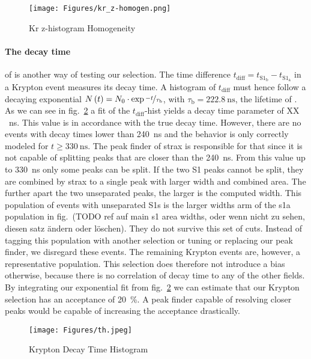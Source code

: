 \begin{figure}
\centering
\texttt{[image: Figures/kr\_z-homogen.png]}  %
\caption[Kr z-histogram Homogeneity]{
    Kr z-histogram Homogeneity
    }
\label{fig:z-hist-homogen}
\end{figure}



\paragraph{The decay time} of  is another way of testing our selection.
The time difference $ t_\mathrm{diff} = t_{\mathrm{S}1_\mathrm{b}} - t_{\mathrm{S}1_\mathrm{a}} $ in a Krypton event measures its decay time.
A histogram of $ t_\mathrm{diff} $ must hence follow a decaying exponential $ N \left( t \right) = N_0 \cdot \exp{\nicefrac{-t}{\tau_\mathrm{b}}} $, with $ \tau_\mathrm{b} = \SI{222.8}{\nano\s} $, the lifetime of .
As we can see in fig.~\ref{fig:kr-decaytime} a fit of the $ t_\mathrm{diff} $-hist yields a decay time parameter of XX \SI{}{\nano\s}. %
This value is in accordance with the true decay time. %
However, there are no events with decay times lower than \SI{240}{\nano\s} and the behavior is only correctly modeled for $ t \ge \SI{330}{\nano\s} $.
The peak finder of strax is responsible for that since it is not capable of splitting peaks that are closer than the \SI{240}{\nano\s}.
From this value up to \SI{330}{\nano\s} only some peaks can be split.
If the two S1 peaks cannot be split, they are combined by strax to a single peak with larger width and combined area.
The further apart the two unseparated peaks, the larger is the computed width.
This population of events with unseparated S1s is the larger widths arm of the \gls{s1a} population in fig.~(TODO ref auf main s1 area widths, oder wenn nicht zu sehen, diesen satz ändern oder löschen).
They do not survive this set of cuts.
Instead of tagging this population with another selection or tuning or replacing our peak finder, we disregard these events.
The remaining Krypton events are, however, a representative population.
This selection does therefore not introduce a bias otherwise, because there is no correlation of decay time to any of the other fields.
By integrating our exponential fit from fig.~\ref{fig:kr-decaytime} we can estimate that our Krypton selection has an acceptance of \SI{20}{\%}.
A peak finder capable of resolving closer peaks would be capable of increasing the acceptance drastically.


\begin{figure}
\centering
\texttt{[image: Figures/th.jpeg]}  %
\caption[Krypton Decay Time Histogram]{
    Krypton Decay Time Histogram
    }
\label{fig:kr-decaytime}
\end{figure}



\FloatBarrier

